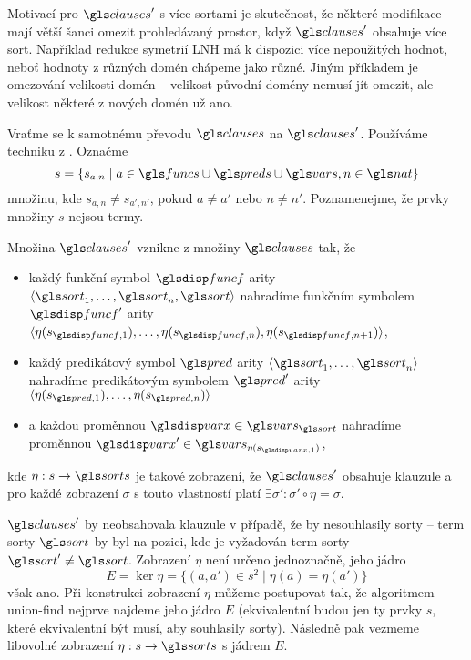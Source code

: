 Motivací pro $\clauses'$ s více sortami je skutečnost,
že některé modifikace mají větší šanci omezit prohledávaný prostor,
když $\clauses'$ obsahuje více sort. Například
redukce symetrií LNH má k dispozici více nepoužitých hodnot,
neboť hodnoty z různých domén chápeme jako různé.
Jiným příkladem je omezování velikosti domén -- velikost původní domény
nemusí jít omezit, ale velikost některé z nových domén už ano.

Vraťme se k samotnému převodu $\clauses$ na $\clauses'$.
Používáme techniku z \cite{claessen03paradox}.
Označme
\[
  s = \{ s_{a, n} \mid  a \in \funcs \cup \preds \cup \vars, n \in \nat\}
\]
množinu, kde
$s_{a, n} \neq s_{a', n'}$, pokud $a \neq a'$ nebo $n \neq n'$.
Poznamenejme, že prvky množiny $s$ nejsou termy.

Množina $\clauses'$ vznikne z množiny $\clauses$ tak, že
\begin{itemize}
\item každý funkční symbol $\func$ arity
  $\langle \sort_1 \comdots \sort_n, \sort \rangle$
  nahradíme funkčním symbolem $\func'$ arity
  $\langle \eta(s_{\func, 1}) \comdots \eta(s_{\func, n}),
  \eta(s_{\func, n + 1}) \rangle$,
\item každý predikátový symbol $\pred$ arity
  $\langle \sort_1 \comdots \sort_n \rangle$
  nahradíme predikátovým symbolem $\pred'$ arity
  $\langle \eta(s_{\pred, 1}) \comdots \eta(s_{\pred, n}) \rangle$
\item a každou proměnnou $\var \in \vars_\sort$ nahradíme
  proměnnou $\var' \in \vars_{\eta(s_{\var, 1})}$,
\end{itemize}
kde $\eta: s \to \sorts$ je takové zobrazení,
že $\clauses'$ obsahuje klauzule a pro každé zobrazení $\sigma$
s touto vlastností platí $\exists \sigma' : \sigma' \circ \eta = \sigma$.


$\clauses'$ by neobsahovala klauzule v případě, že by nesouhlasily
sorty -- term sorty $\sort$ by byl na pozici,
kde je vyžadován term sorty $\sort' \neq \sort$.
Zobrazení $\eta$ není určeno jednoznačně, jeho jádro
\[
  E = \ker \eta = \{ (a, a') \in s^2 \mid \eta(a) = \eta(a') \}
\]
však ano. Při konstrukci zobrazení $\eta$ můžeme postupovat tak,
že algoritmem union-find nejprve najdeme jeho jádro $E$
(ekvivalentní budou jen ty prvky $s$, které ekvivalentní být musí,
aby souhlasily sorty). Následně pak vezmeme libovolné zobrazení
$\eta : s \to \sorts$ s jádrem $E$.

